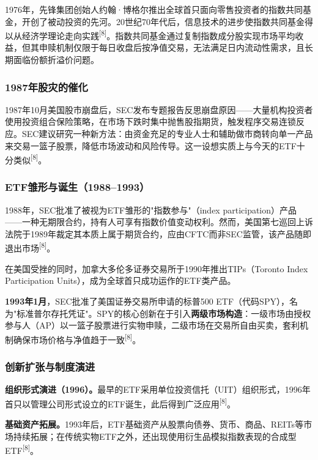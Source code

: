 \documentclass[10pt,a4paper,twocolumn]{ctexart}
\begin{document}
1976年，先锋集团创始人约翰·博格尔推出全球首只面向零售投资者的指数共同基金，开创了被动投资的先河。20世纪70年代后，信息技术的进步使指数共同基金得以从经济学理论走向实践\textsuperscript{[8]}。指数共同基金通过复制指数成分股实现市场平均收益，但其申赎机制仅限于每日收盘后按净值交易，无法满足日内流动性需求，且长期面临份额折溢价问题。

\subsubsection{1987年股灾的催化}

1987年10月美国股市崩盘后，SEC发布专题报告反思崩盘原因——大量机构投资者使用投资组合保险策略，在市场下跌时集中抛售股指期货，触发程序交易连锁反应。SEC建议研究一种新方法：由资金充足的专业人士和辅助做市商转向单一产品来交易一篮子股票，降低市场波动和风险传导。这一设想实质上与今天的ETF十分类似\textsuperscript{[8]}。

\subsubsection{ETF雏形与诞生（1988--1993）}

1988年，SEC批准了被视为ETF雏形的"指数参与"（index participation）产品——一种无期限合约，持有人可享有指数价值变动权利。然而，美国第七巡回上诉法院于1989年裁定其本质上属于期货合约，应由CFTC而非SEC监管，该产品随即退出市场\textsuperscript{[8]}。

在美国受挫的同时，加拿大多伦多证券交易所于1990年推出TIPs（Toronto Index Participation Units），成为全球首只成功运作的ETF类产品。

\textbf{1993年1月}，SEC批准了美国证券交易所申请的标普500 ETF（代码SPY），名为"标准普尔存托凭证"。SPY的核心创新在于引入\textbf{两级市场构造}：一级市场由授权参与人（AP）以一篮子股票进行实物申赎，二级市场在交易所自由买卖，套利机制确保市场价格与净值趋于一致\textsuperscript{[8]}。

\subsubsection{创新扩张与制度演进}

\textbf{组织形式演进（1996）。}最早的ETF采用单位投资信托（UIT）组织形式，1996年首只以管理公司形式设立的ETF诞生，此后得到广泛应用\textsuperscript{[8]}。

\textbf{基础资产拓展。}1993年后，ETF基础资产从股票向债券、货币、商品、REITs等市场持续拓展；在传统实物ETF之外，还出现使用衍生品模拟指数表现的合成型ETF\textsuperscript{[8]}。
\end{document}
